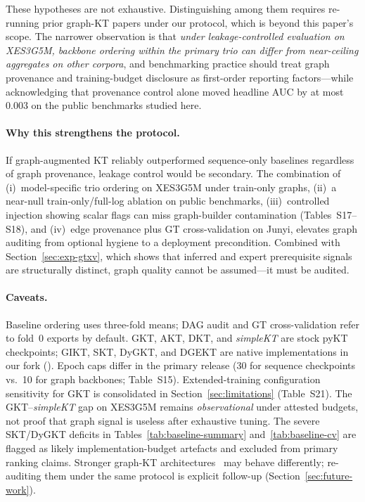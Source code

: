 \documentclass[pdflatex,sn-mathphys-num]{sn-jnl}
\begin{document}
These hypotheses are not exhaustive. Distinguishing among them requires
re-running prior graph-KT papers under our protocol, which is beyond this
paper's scope. The narrower observation is that \emph{under leakage-controlled
evaluation on XES3G5M, backbone ordering within the primary trio can differ
from near-ceiling aggregates on other corpora}, and benchmarking practice
should treat graph provenance and training-budget disclosure as first-order
reporting factors---while acknowledging that provenance control alone moved
headline AUC by at most $0.003$ on the public benchmarks studied here.

\paragraph{Why this strengthens the protocol.}
If graph-augmented KT reliably outperformed sequence-only baselines
regardless of graph provenance, leakage control would be secondary. The
combination of (i)~model-specific trio ordering on XES3G5M under train-only
graphs, (ii)~a near-null train-only/full-log ablation on public benchmarks,
(iii)~controlled injection showing scalar flags can miss graph-builder
contamination (Tables~S17--S18), and (iv)~edge provenance plus GT
cross-validation on Junyi, elevates graph auditing from optional hygiene to a
deployment precondition. Combined with Section~\ref{sec:exp-gtxv}, which shows
that inferred and expert prerequisite signals are structurally distinct, graph
quality cannot be assumed---it must be audited.

\paragraph{Caveats.}
Baseline ordering uses three-fold means; DAG audit and GT cross-validation
refer to fold~0 exports by default. GKT, AKT, DKT, and \textit{simpleKT} are
stock pyKT~\cite{liu2022pykt} checkpoints; GIKT, SKT, DyGKT, and DGEKT are
native implementations in our fork (). Epoch caps differ in
the primary release (30 for sequence checkpoints vs.\ 10 for graph backbones;
Table~S15). Extended-training configuration sensitivity for GKT is consolidated
in Section~\ref{sec:limitations} (Table~S21).
The GKT--\textit{simpleKT} gap on XES3G5M remains \emph{observational} under
attested budgets, not proof that graph signal is useless after exhaustive tuning.
The severe SKT/DyGKT deficits in Tables~\ref{tab:baseline-summary}
and~\ref{tab:baseline-cv} are flagged as likely implementation-budget artefacts
and excluded from primary ranking claims. Stronger graph-KT architectures~\cite{tong2020skt,dygkt2024,dgekt2024}
may behave differently; re-auditing them under the same protocol is explicit
follow-up (Section~\ref{sec:future-work}).
\end{document}
